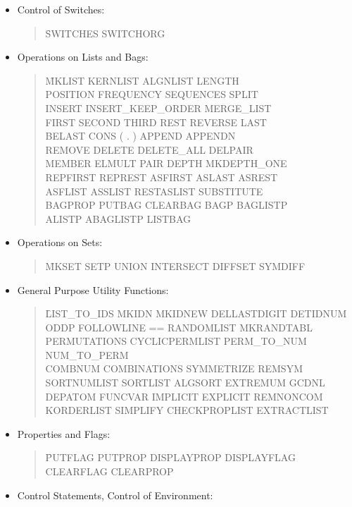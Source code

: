 \begin{itemize}
\item{Control of Switches:}
\begin{quote}
\f{SWITCHES SWITCHORG}
\end{quote}
\item{Operations on Lists and Bags:}
\begin{quote}
\f{MKLIST KERNLIST ALGNLIST LENGTH \\
POSITION FREQUENCY SEQUENCES SPLIT \\
INSERT INSERT\_KEEP\_ORDER MERGE\_LIST \\
FIRST SECOND THIRD REST REVERSE LAST \\
BELAST CONS ( . ) APPEND APPENDN \\
REMOVE DELETE DELETE\_ALL DELPAIR \\
MEMBER ELMULT PAIR DEPTH MKDEPTH\_ONE \\
REPFIRST REPREST ASFIRST ASLAST ASREST \\
ASFLIST ASSLIST RESTASLIST SUBSTITUTE \\
BAGPROP PUTBAG CLEARBAG BAGP BAGLISTP \\
ALISTP ABAGLISTP LISTBAG}
\end{quote}
\item{Operations on Sets:}
\begin{quote}
\f{MKSET SETP UNION INTERSECT DIFFSET SYMDIFF}
\end{quote}
\item{General Purpose Utility Functions:}
\begin{quote}
\f{LIST\_TO\_IDS MKIDN MKIDNEW DELLASTDIGIT DETIDNUM \\
ODDP FOLLOWLINE  == RANDOMLIST MKRANDTABL \\
PERMUTATIONS CYCLICPERMLIST PERM\_TO\_NUM NUM\_TO\_PERM\\ 
COMBNUM COMBINATIONS SYMMETRIZE REMSYM \\
SORTNUMLIST SORTLIST ALGSORT EXTREMUM GCDNL\\
DEPATOM FUNCVAR IMPLICIT EXPLICIT REMNONCOM \\
KORDERLIST SIMPLIFY CHECKPROPLIST EXTRACTLIST} 
\end{quote}
\item{Properties and Flags:}
\begin{quote}
\f{PUTFLAG PUTPROP DISPLAYPROP DISPLAYFLAG \\
CLEARFLAG CLEARPROP }
\end{quote}
\item{Control Statements, Control of Environment:}

\end{itemize}
